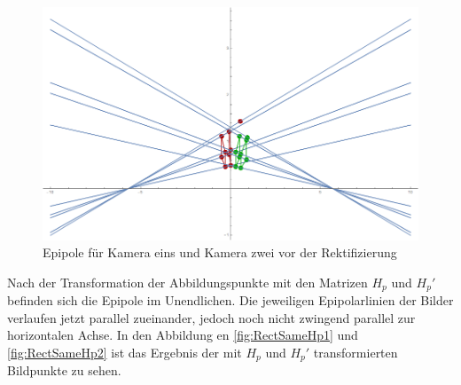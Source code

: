 \begin{figure}[!htb]
	\centering
	\includegraphics[width=.8\linewidth]{images/Rectification_two_same_Solutions.png}
	\caption[Epipolarlinien und Epipole vor der Rektifizierung]{Epipole für Kamera eins und Kamera zwei vor der Rektifizierung } 
	\label{fig:RectOriginalELines}
\end{figure}




Nach der Transformation der Abbildungspunkte mit den Matrizen $H_p$ und $H_p'$ befinden sich die Epipole im Unendlichen. Die jeweiligen Epipolarlinien der Bilder verlaufen jetzt parallel zueinander, jedoch noch nicht zwingend parallel zur horizontalen Achse. In den Abbildung en \ref{fig:RectSameHp1} und \ref{fig:RectSameHp2} ist das Ergebnis der mit $H_p$ und $H_p'$ transformierten Bildpunkte zu sehen.



